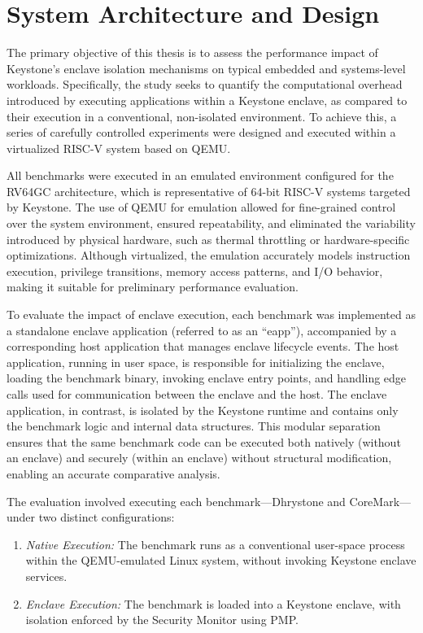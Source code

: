 \chapter{System Architecture and Design}
\label{chap:methodology}
The primary objective of this thesis is to assess the performance impact of Keystone’s enclave isolation mechanisms on typical embedded and systems-level workloads. Specifically, the study seeks to quantify the computational overhead introduced by executing applications within a Keystone enclave, as compared to their execution in a conventional, non-isolated environment. To achieve this, a series of carefully controlled experiments were designed and executed within a virtualized RISC-V system based on QEMU.

All benchmarks were executed in an emulated environment configured for the RV64GC architecture, which is representative of 64-bit RISC-V systems targeted by Keystone. The use of QEMU for emulation allowed for fine-grained control over the system environment, ensured repeatability, and eliminated the variability introduced by physical hardware, such as thermal throttling or hardware-specific optimizations. Although virtualized, the emulation accurately models instruction execution, privilege transitions, memory access patterns, and I/O behavior, making it suitable for preliminary performance evaluation.

To evaluate the impact of enclave execution, each benchmark was implemented as a standalone enclave application (referred to as an “eapp”), accompanied by a corresponding host application that manages enclave lifecycle events. The host application, running in user space, is responsible for initializing the enclave, loading the benchmark binary, invoking enclave entry points, and handling edge calls used for communication between the enclave and the host. The enclave application, in contrast, is isolated by the Keystone runtime and contains only the benchmark logic and internal data structures. This modular separation ensures that the same benchmark code can be executed both natively (without an enclave) and securely (within an enclave) without structural modification, enabling an accurate comparative analysis.

The evaluation involved executing each benchmark—Dhrystone and CoreMark—under two distinct configurations:

\begin{enumerate}
\item \textit{Native Execution:} The benchmark runs as a conventional user-space process within the QEMU-emulated Linux system, without invoking Keystone enclave services.
\item \textit{Enclave Execution:} The benchmark is loaded into a Keystone enclave, with isolation enforced by the Security Monitor using PMP.
\end{enumerate}

